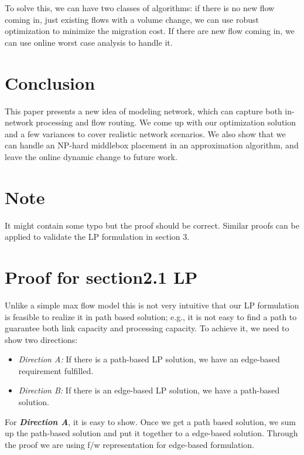 \documentclass[twocolumn]{article}
\begin{document}
To solve this, we can have two classes of algorithms: if there is no new flow coming in, just existing flows with a volume change, we can use robust optimization to minimize the migration cost. If there are new flow coming in, we can use online worst case analysis to handle it. 


\section{Conclusion}
This paper presents a new idea of modeling network, which can capture both in-network processing and flow routing. We come up with our optimization solution and a few variances to cover realistic network scenarios. We also show that we can handle an NP-hard middlebox placement in an approximation algorithm, and leave the online dynamic change to future work. 







 

\appendix
\section{Note}
It might contain some typo but the proof should be correct. Similar proofs can be applied to validate the LP formulation in section 3. 
\section{Proof for section2.1 LP}
Unlike a simple max flow model this is not very intuitive that our LP formulation is feasible to realize it in path based solution; e.g., it is not easy to find a path to guarantee both link capacity and processing capacity. To achieve it, we need to show two directions:
\begin{itemize}
  \item {\textit{Direction A:} If there is a path-based LP solution, we have an edge-based requirement fulfilled.}
  \item {\textit{Direction B:} If there is an edge-based LP solution, we have a path-based solution.}
\end{itemize}
For \textbf{\textit{Direction A}}, it is easy to show. Once we get a path based solution, we sum up the path-based solution and put it together to a edge-based solution. Through the proof we are using f/w representation for edge-based formulation.
\end{document}
